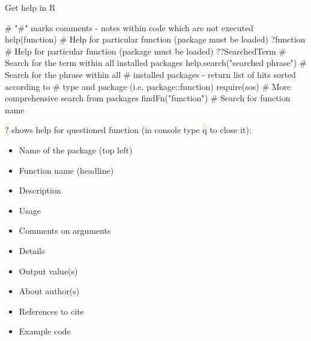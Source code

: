 \documentclass[compress, ucs, xelatex, 11pt, xcolor=svgnames, aspectratio=169,
	hyperref={
		bookmarks=true,
		unicode=true,
		colorlinks=true,
		pdftitle={Molecular data in R},
		plainpages=false,
		pdfauthor={Vojtech Zeisek},
		pdfsubject={Course about phylogeny and evolution in R},
		pdfcreator={XeLaTeX},
		pdfkeywords={R, evolution, phylogeny, molecular data},
		linkcolor=Crimson, %
		anchorcolor=Magenta, %
		citecolor=Magenta, %
		filecolor=Magenta, %
		menucolor=Magenta, %
		urlcolor=DodgerBlue, %
		pdftex},
	url={hyphens, lowtilde} %
	]{beamer}
\renewcommand{\texttt}[1]{\colorbox{Beige}{{\ttfamily #1}}}
\begin{document}
\begin{frame}[fragile]{Get help in R}
	\begin{spluscode}
    # "#" marks comments - notes within code which are not executed
    help(function) # Help for particular function (package must be loaded)
    ?function # Help for particular function (package must be loaded)
    ??SearchedTerm # Search for the term within all installed packages
    help.search("searched phrase") # Search for the phrase within all
      # installed packages - return list of hits sorted according to
      # type and package (i.e. package::function)
    require(sos) # More comprehensive search from packages
    findFn("function") # Search for function name
	\end{spluscode}
	\vfill
	\alert{\texttt{?}} shows help for questioned function (in console type \texttt{q} to close it):
	\vfill
	\begin{multicols}{2}
		\begin{itemize}
			\item Name of the package (top left)
			\item Function name (headline)
			\item Description
			\item Usage
			\item Comments on arguments
			\item Details
			\item Output value(s)
			\item About author(s)
			\item References to cite
			\item Example code
		\end{itemize}
	\end{multicols}
	\vfill
\end{frame}
\end{document}
